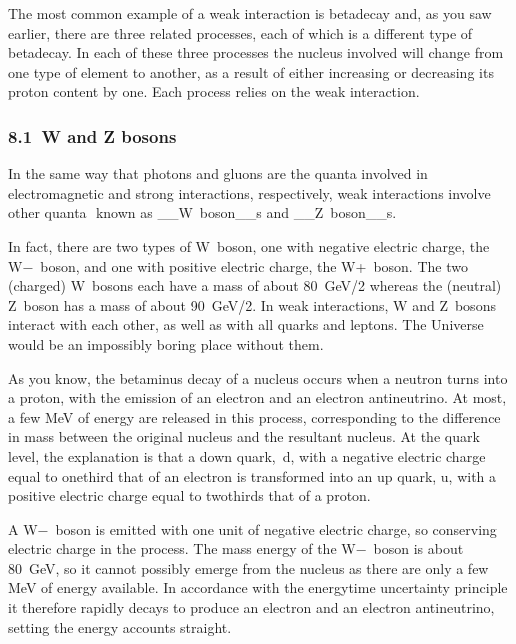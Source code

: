 \documentclass[letterpaper,10pt,english]{sphinxmanual}
\begin{document}
The most common example of a weak interaction is beta\sphinxhyphen{}decay and, as you saw earlier, there are three related processes, each of which is a different type of beta\sphinxhyphen{}decay. In each of these three processes the nucleus involved will change from one type of element to another, as a result of either increasing or decreasing its proton content by one. Each process relies on the weak interaction.


\subsubsection{8.1 W and Z bosons}
\label{\detokenize{content/session_00/Part_00_08:8.1_xa0W-and-Z-bosons}}
In the same way that photons and gluons are the quanta involved in electromagnetic and strong interactions, respectively, weak interactions involve other quanta ­\textendash{} known as \_\_W boson\_\_s and \_\_Z boson\_\_s.

In fact, there are two types of W boson, one with negative electric charge, the W− boson, and one with positive electric charge, the W+ boson. The two (charged) W bosons each have a mass of about 80 GeV/2 whereas the (neutral) Z boson has a mass of about 90 GeV/2. In weak interactions, W and Z bosons interact with each other, as well as with all quarks and leptons. The Universe would be an impossibly boring place without them.

As you know, the beta\sphinxhyphen{}minus decay of a nucleus occurs when a neutron turns into a proton, with the emission of an electron and an electron antineutrino. At most, a few MeV of energy are released in this process, corresponding to the difference in mass between the original nucleus and the resultant nucleus. At the quark level, the explanation is that a down quark, d, with a negative electric charge equal to one\sphinxhyphen{}third that of an electron is transformed into an up quark, u, with a positive electric
charge equal to two\sphinxhyphen{}thirds that of a proton.

A W− boson is emitted with one unit of negative electric charge, so conserving electric charge in the process. The mass energy of the W− boson is about 80 GeV, so it cannot possibly emerge from the nucleus as there are only a few MeV of energy available. In accordance with the energy\textendash{}time uncertainty principle it therefore rapidly decays to produce an electron and an electron antineutrino, setting the energy accounts straight.
\end{document}
